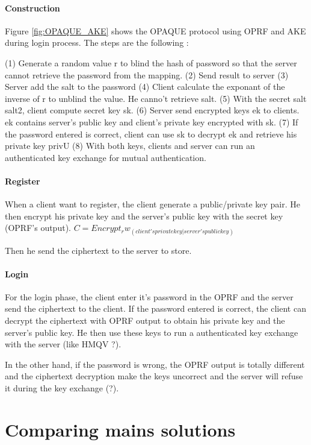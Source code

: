 \documentclass[../report.tex]{subfiles}
\begin{document}
\paragraph{Construction}

Figure \ref{fig:OPAQUE_AKE} shows the OPAQUE protocol using OPRF and AKE during login process.
The steps are the following :

(1) Generate a random value r to blind the hash of password so that the server cannot retrieve the password from the mapping.
(2) Send result to server
(3) Server add the salt to the password
(4) Client calculate the exponant of the inverse of r to unblind the value. He canno't retrieve salt.
(5) With the secret salt salt2, client compute secret key sk.
(6) Server send encrypted keys ek to clients. ek contains server's public key and client's private key encrypted with sk.
(7) If the password entered is correct, client can use sk to decrypt ek and retrieve his private key privU
(8) With both keys, clients and server can run an authenticated key exchange for mutual authentication.


\paragraph{Register}
When a client want to register, the client generate a public/private key pair. He then encrypt his private key and the server's public key with the secret key (OPRF's output).
$C = Encrypt_rw_(client's private key | server's public key)$

Then he send the ciphertext to the server to store.


\paragraph{Login}
For the login phase, the client enter it's password in the OPRF and the server send the ciphertext to the client.
If the password entered is correct, the client can decrypt the ciphertext with OPRF output to obtain his private key and the server's public key.
He then use these keys to run a authenticated key exchange with the server (like HMQV ?).

In the other hand, if the password is wrong, the OPRF output is totally different and the ciphertext decryption make the keys uncorrect and the server will refuse it during the key exchange (?). %




\section{Comparing mains solutions}
\end{document}
